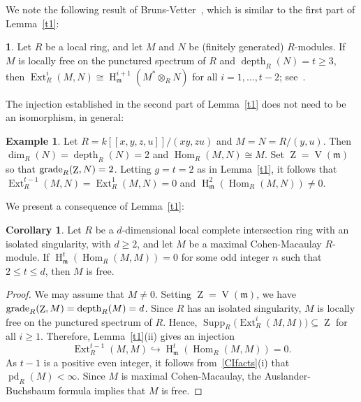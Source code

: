 \documentclass[11pt]{amsart}
\theoremstyle{definition}
\newtheorem{cor}[thm]{Corollary}
\theoremstyle{definition}
\newtheorem{eg}[thm]{Example}
\newtheorem{chunk}[thm]{\hspace*{-1.065ex}\bf}
\numberwithin{equation}{section}
\newcommand{\fm}{\mathfrak{m}}
\DeclareMathOperator{\gr}{\textnormal{grade}}
\DeclareMathOperator{\V}{V}
\DeclareMathOperator{\mz}{Z}
\DeclareMathOperator{\depth}{depth}
\DeclareMathOperator{\Ext}{Ext}
\DeclareMathOperator{\hh}{H}
\DeclareMathOperator{\Hom}{Hom}
\DeclareMathOperator{\pd}{pd}
\DeclareMathOperator{\Supp}{Supp}
\begin{document}
We note the following result of Bruns-Vetter~\cite{BV}, which is similar to the first part of Lemma~\ref{t1}:

\begin{chunk} Let $R$ be a local ring, and let $M$ and $N$ be (finitely generated) $R$-modules. If $M$ is locally free on the punctured spectrum of $R$ and $\depth_R(N)=t\geq 3$, then $\Ext^i_R(M,N)\cong\hh_{\fm}^{i+1}(M^{\ast}\otimes_RN)$ for all $i=1, \ldots, t-2$; see~\cite[4.1]{BV}.
\end{chunk}

The injection established in the second part of Lemma~\ref{t1} does not need to be an isomorphism, in general:

\begin{eg} Let $R=k[\![x,y, z, u]\!]/(xy, zu)$ and $M=N=R/(y,u)$. Then $\dim_R(N)=\depth_R(N)=2$ and $\Hom_R(M,N)\cong M$. Set $\mz=\V(\fm)$ so that $\gr_R(\mz,N)=2$. Letting $g=t=2$ as in Lemma~\ref{t1}, it follows that $\Ext^{t-1}_R(M,N)=\Ext^{1}_R(M,N)=0$ and $\hh_{\fm}^{2}\left(\Hom_R(M,N)\right)\neq 0$. 
\end{eg}

We present a consequence of Lemma~\ref{t1}:

\begin{cor} Let $R$ be a $d$-dimensional local complete intersection ring with an isolated singularity, with $d\geq 2$, and let $M$ be a maximal Cohen-Macaulay $R$-module. If $\hh_{\fm}^{t}\left(\Hom_R(M,M)\right)=0$ for some odd integer $n$ such that $2\leq t \leq d$, then $M$ is free.
\end{cor} 

\begin{proof}
We may assume that $M\neq0$.
Setting $\mz=\V(\fm)$, we have
$\gr_R(\mz,M)=\depth_R(M)=d$.
Since $R$ has an isolated singularity, $M$ is locally free
on the punctured spectrum of $R$. Hence, 
$\Supp_R\bigl(\Ext^i_R(M,M)\bigr)\subseteq\mz$
for all $i\geq1$.
Therefore, Lemma~\ref{t1}(ii) gives an injection
\[
\Ext^{t-1}_R(M,M)
\hookrightarrow
\hh_{\fm}^{t}\left(\Hom_R(M,M)\right)=0.
\]
As $t-1$ is a positive even integer, it follows
from~\ref{CIfacts}(i) that $\pd_R(M)<\infty$.
Since $M$ is maximal Cohen-Macaulay, the
Auslander-Buchsbaum formula implies that $M$ is free.
\end{proof}
\end{document}
